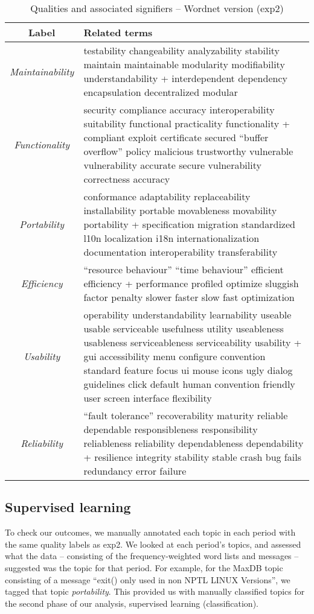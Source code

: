 \documentclass[10pt, conference, compsocconf]{IEEEtran}
\begin{document}
\begin{table*}[h]
	\caption{Qualities and associated signifiers – Wordnet version (\textsf{exp2})}
	\centering
	\label{tbl:wnsig}
\begin{tabular}{c|p{9cm}}
\toprule
\textbf{Label} & \textbf{Related terms} \\
\midrule
\emph{Maintainability} &
testability changeability analyzability stability maintain maintainable modularity modifiability understandability + interdependent dependency encapsulation decentralized modular\\ \hline
\emph{Functionality} &
security compliance accuracy interoperability suitability functional practicality functionality + compliant exploit certificate secured “buffer overflow” policy malicious trustworthy vulnerable vulnerability accurate secure vulnerability correctness accuracy\\ \hline
\emph{Portability} &
conformance adaptability replaceability installability portable movableness movability portability + specification migration standardized l10n localization i18n internationalization documentation interoperability transferability\\ \hline
\emph{Efficiency} &
“resource behaviour” “time behaviour” efficient efficiency + performance profiled optimize sluggish factor penalty slower faster slow fast optimization\\ \hline
\emph{Usability} &
operability understandability learnability useable usable serviceable usefulness utility useableness usableness serviceableness serviceability usability + gui accessibility menu configure convention standard feature focus ui mouse icons ugly dialog guidelines click default human convention friendly user screen interface flexibility\\ \hline
\emph{Reliability} &
“fault tolerance” recoverability maturity reliable dependable responsibleness responsibility reliableness reliability dependableness dependability + resilience integrity stability stable crash bug fails redundancy error failure\\ 
\bottomrule
\end{tabular}
\end{table*}

\subsection{Supervised learning}
To check our outcomes, we manually annotated each topic in each period with the same quality labels as \textsf{exp2}. We looked at each period's topics, and assessed what the data -- consisting of the frequency-weighted word lists and messages -- suggested was the topic for that period. For example, for the MaxDB topic consisting of a message ``exit() only used in non NPTL LINUX Versions'', we tagged that topic \emph{portability}. This provided us with manually classified topics for the second phase of our analysis, supervised learning (classification).
\end{document}
